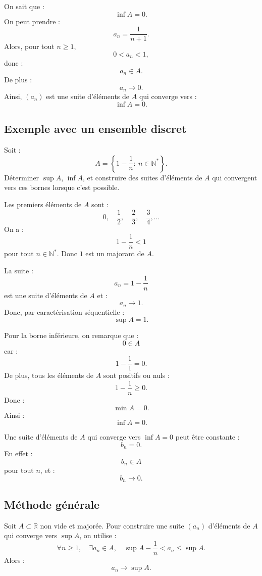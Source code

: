 \documentclass[11pt,a4paper]{article}
\newcommand{\N}{\mathbb N}
\newcommand{\R}{\mathbb R}
\begin{document}
\begin{correctionbox}
On sait que :
\[
\inf A=0.
\]
On peut prendre :
\[
a_n=\frac1{n+1}.
\]
Alors, pour tout \(n\geq1\),
\[
0<a_n<1,
\]
donc :
\[
a_n\in A.
\]
De plus :
\[
a_n\longrightarrow0.
\]
Ainsi, \((a_n)\) est une suite d'éléments de \(A\) qui converge vers :
\[
\inf A=0.
\]
\end{correctionbox}

\subsection{Exemple avec un ensemble discret}

\begin{exercicebox}
Soit :
\[
A=\left\{1-\frac1n:\ n\in\N^*\right\}.
\]
Déterminer \(\sup A\), \(\inf A\), et construire des suites d'éléments de \(A\) qui convergent vers ces bornes lorsque c'est possible.
\end{exercicebox}

\begin{correctionbox}
Les premiers éléments de \(A\) sont :
\[
0,\quad \frac12,\quad \frac23,\quad \frac34,\dots
\]
On a :
\[
1-\frac1n<1
\]
pour tout \(n\in\N^*\).  
Donc \(1\) est un majorant de \(A\).

La suite :
\[
a_n=1-\frac1n
\]
est une suite d'éléments de \(A\) et :
\[
a_n\to1.
\]
Donc, par caractérisation séquentielle :
\[
\sup A=1.
\]

Pour la borne inférieure, on remarque que :
\[
0\in A
\]
car :
\[
1-\frac11=0.
\]
De plus, tous les éléments de \(A\) sont positifs ou nuls :
\[
1-\frac1n\geq0.
\]
Donc :
\[
\min A=0.
\]
Ainsi :
\[
\inf A=0.
\]

Une suite d'éléments de \(A\) qui converge vers \(\inf A=0\) peut être constante :
\[
b_n=0.
\]
En effet :
\[
b_n\in A
\]
pour tout \(n\), et :
\[
b_n\to0.
\]
\end{correctionbox}

\subsection{Méthode générale}

\begin{methodbox}
Soit \(A\subset\R\) non vide et majorée.  
Pour construire une suite \((a_n)\) d'éléments de \(A\) qui converge vers \(\sup A\), on utilise :
\[
\forall n\geq1,\quad \exists a_n\in A,\quad
\sup A-\frac1n<a_n\leq \sup A.
\]
Alors :
\[
a_n\to\sup A.
\]
\end{methodbox}
\end{document}
